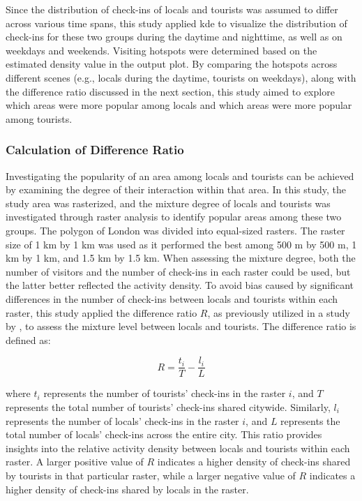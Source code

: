 \documentclass{article}
\theoremstyle{remark}
\begin{document}
Since the distribution of check-ins of locals and tourists was assumed to differ across various time spans, this study applied \acrshort{kde} to visualize the distribution of check-ins for these two groups during the daytime and nighttime, as well as on weekdays and weekends. Visiting hotspots were determined based on the estimated density value in the output plot. By comparing the hotspots across different scenes (e.g., locals during the daytime, tourists on weekdays), along with the difference ratio discussed in the next section, this study aimed to explore which areas were more popular among locals and which areas were more popular among tourists.


\subsubsection{Calculation of Difference Ratio}
Investigating the popularity of an area among locals and tourists can be achieved by examining the degree of their interaction within that area. In this study, the study area was rasterized, and the mixture degree of locals and tourists was investigated through raster analysis to identify popular areas among these two groups. The polygon of London was divided into equal-sized rasters. The raster size of 1 km by 1 km was used as it performed the best among 500 m by 500 m, 1 km by 1 km, and 1.5 km by 1.5 km. When assessing the mixture degree, both the number of visitors and the number of check-ins in each raster could be used, but the latter better reflected the activity density. To avoid bias caused by significant differences in the number of check-ins between locals and tourists within each raster, this study applied the difference ratio $R$, as previously utilized in a study by \cite{li_analyzing_2018}, to assess the mixture level between locals and tourists. The difference ratio is defined as:

\begin{equation} \label{eq:diff_ratio}
    R = \frac{t_{i}}{T}-\frac{l_{i}}{L}
\end{equation}

where $t_{i}$ represents the number of tourists' check-ins in the raster $i$, and $T$ represents the total number of tourists' check-ins shared citywide. Similarly, $l_{i}$ represents the number of locals' check-ins in the raster $i$, and $L$ represents the total number of locals' check-ins across the entire city. This ratio provides insights into the relative activity density between locals and tourists within each raster. A larger positive value of $R$ indicates a higher density of check-ins shared by tourists in that particular raster, while a larger negative value of \(R\) indicates a higher density of check-ins shared by locals in the raster.
\end{document}

